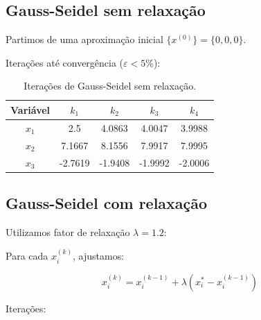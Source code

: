 \documentclass[12pt]{article}
\begin{document}
\subsection{Gauss-Seidel sem relaxação}

Partimos de uma aproximação inicial $\{x^{(0)}\} = \{0, 0, 0\}$.

Iterações até convergência ($\varepsilon < 5\%$):

\begin{table}[H]
  \centering
  \begin{tabular}{|c|c|c|c|c|}
    \hline
    \textbf{Variável} & \textbf{$k_1$} & \textbf{$k_2$} & \textbf{$k_3$} & \textbf{$k_4$} \\
    \hline
    $x_1$ & 2.5 & 4.0863 & 4.0047 & 3.9988 \\
    $x_2$ & 7.1667 & 8.1556 & 7.9917 & 7.9995 \\
    $x_3$ & -2.7619 & -1.9408 & -1.9992 & -2.0006 \\
    \hline
  \end{tabular}
  \caption{Iterações de Gauss-Seidel sem relaxação.}
  \label{tab:gs_s_relaxacao}
\end{table}

\subsection{Gauss-Seidel com relaxação}

Utilizamos fator de relaxação $\lambda = 1.2$:

Para cada $x_i^{(k)}$, ajustamos:

\[
x_i^{(k)} = x_i^{(k-1)} + \lambda\left(x_i^{*} - x_i^{(k-1)}\right)
\]

Iterações:

\begin{table}[H]
  \centering
  \caption{Iterações de Gauss-Seidel com relaxação.}
  \label{tab:gs_c_relaxacao}
\end{table}
\end{document}
